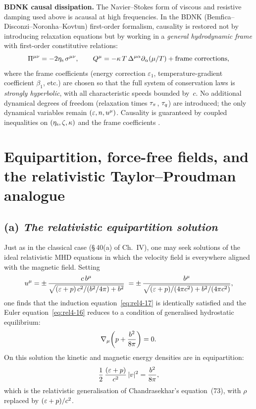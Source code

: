 \begin{relcorrection}
\textbf{BDNK causal dissipation.}
The Navier--Stokes form of viscous and resistive damping used above is
acausal at high frequencies.  In the BDNK (Bemfica--Disconzi--Noronha--Kovtun)
first-order formalism, causality is restored not by introducing relaxation
equations but by working in a \emph{general hydrodynamic frame} with
first-order constitutive relations:
\[
  \Pi^{\mu\nu} = -2\eta_{\mathrm{s}}\,\sigma^{\mu\nu},
  \qquad
  Q^{\mu} = -\kappa\,T\,\Delta^{\mu\alpha}\partial_{\alpha}(\mu/T)
    + \text{frame corrections},
\]
where the frame coefficients (energy correction $\varepsilon_1$,
temperature-gradient coefficient $\beta_1$, etc.) are chosen so that the
full system of conservation laws is \emph{strongly hyperbolic}, with all
characteristic speeds bounded by~$c$.  No additional dynamical degrees
of freedom (relaxation times $\tau_{\pi}$, $\tau_{q}$) are introduced; the only
dynamical variables remain $(\varepsilon, n, u^{\mu})$.  Causality is
guaranteed by coupled inequalities on $(\eta_{\mathrm{s}}, \zeta, \kappa)$
and the frame coefficients
\citep{BemficaDN2018,Kovtun2019,BemficaDN2019}.
\end{relcorrection}


\section{Equipartition, force-free fields, and the relativistic
Taylor--Proudman analogue}\label{sec:rel40}

\subsection*{(a) \emph{The relativistic equipartition solution}}

Just as in the classical case (\S\,40(a) of Ch.~IV), one may seek
solutions of the ideal relativistic MHD equations in which the velocity
field is everywhere aligned with the magnetic field.  Setting
\begin{equation}\label{eq:rel4-31}
  u^{\mu} = \pm\,\frac{c\,b^{\mu}}
    {\sqrt{(\varepsilon+p)\,c^{2}/(b^2/4\pi)+b^2}}\;
  = \pm\,\frac{b^{\mu}}
    {\sqrt{(\varepsilon+p)/(4\pi c^{2})+b^2/(4\pi c^{2})}},
\end{equation}
one finds that the induction equation~\eqref{eq:rel4-17} is identically
satisfied and the Euler equation~\eqref{eq:rel4-16} reduces to a condition
of generalised hydrostatic equilibrium:
\begin{equation}\label{eq:rel4-32}
  \nabla_{\mu}\!\left(p + \frac{b^2}{8\pi}\right) = 0.
\end{equation}
On this solution the kinetic and magnetic energy densities are in
equipartition:
\begin{equation}\label{eq:rel4-33}
  \frac{1}{2}\,\frac{(\varepsilon+p)}{c^{2}}\,|v|^{2}
  = \frac{b^2}{8\pi},
\end{equation}
which is the relativistic generalisation of Chandrasekhar's
equation~(73), with $\rho$ replaced by $(\varepsilon+p)/c^{2}$.

